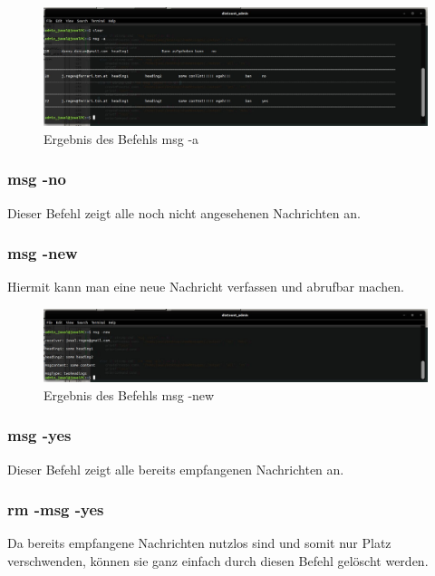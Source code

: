 \documentclass[12pt]{report}
\begin{document}
\begin{figure}[h]
	\centering
	\includegraphics[width=16.5cm]{images/msg_a}
	\caption[Befehl msg -a]{Ergebnis des Befehls msg -a}
\end{figure}
  
  

\subsubsection{msg -no}
Dieser Befehl zeigt alle noch nicht angesehenen Nachrichten an.



  
\subsubsection{msg -new}
Hiermit kann man eine neue Nachricht verfassen und abrufbar machen.


\begin{figure}[H]
	\centering
	\includegraphics[width=16.5cm]{images/msg_new}
	\caption[Befehl msg -new]{Ergebnis des Befehls msg -new}
\end{figure}


\subsubsection{msg -yes}
Dieser Befehl zeigt alle bereits empfangenen Nachrichten an.



\subsubsection{rm -msg -yes}
Da bereits empfangene Nachrichten nutzlos sind und somit nur Platz verschwenden, können sie ganz einfach durch diesen Befehl gelöscht werden.
\end{document}
